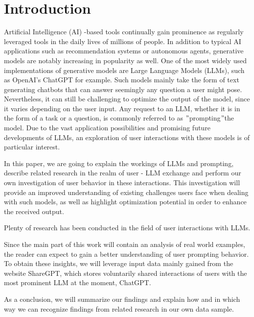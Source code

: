 
\section{Introduction}
\label{sec:introduction}

\sloppy %
Artificial Intelligence (AI) -based tools continually gain prominence as regularly leveraged tools in the
daily lives of millions of people.
In addition to typical AI applications such as recommendation systems or autonomous agents, generative
models are notably increasing in popularity as well.
One of the most widely used implementations of generative models are Large Language Models (LLMs),
such as OpenAI's ChatGPT for example.%
Such models mainly take the form of text generating chatbots that can answer seemingly any question
a user might pose.
Nevertheless, it can still be challenging to optimize the output of the model, since it varies depending
on the user input. %
Any request to an LLM, whether it is in the form of a task or a question, is commonly referred to as
\("\)prompting\("\)the model.
Due to the vast application possibilities and promising future developments of LLMs,
an exploration of user interactions with these models is of particular interest.

In this paper, we are going to explain the workings of LLMs and prompting, describe related research
in the realm of user - LLM exchange and perform our own investigation of user behavior in these
interactions.
This investigation will provide an improved understanding of existing challenges users face when
dealing with such models, as well as highlight optimization potential in order to enhance the received
output.

Plenty of research has been conducted in the field of user interactions with LLMs.

Since the main part of this work will contain an analysis of real world examples, the reader can
expect to gain a better understanding of user prompting behavior.
To obtain these insights, we will leverage input data mainly gained from the website ShareGPT, %
which stores voluntarily shared interactions of users with the most prominent LLM at the moment,
ChatGPT. %

As a conclusion, we will summarize our findings and explain how and in which way we can recognize
findings from related research in our own data sample.